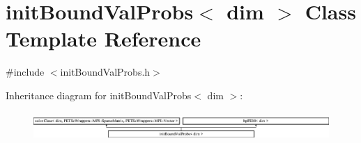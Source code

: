 \section{init\+Bound\+Val\+Probs$<$ dim $>$ Class Template Reference}
\label{classinit_bound_val_probs}


{\ttfamily \#include $<$init\+Bound\+Val\+Probs.\+h$>$}

Inheritance diagram for init\+Bound\+Val\+Probs$<$ dim $>$\+:\begin{figure}[H]
\begin{center}
\leavevmode
\includegraphics[height=1.100196cm]{classinit_bound_val_probs}
\end{center}
\end{figure}
